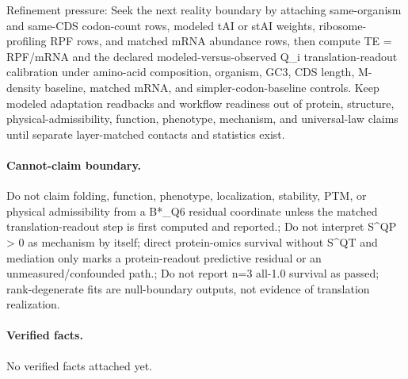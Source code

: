 Refinement pressure: Seek the next reality boundary by attaching same-organism and same-CDS codon-count rows, modeled tAI or stAI weights, ribosome-profiling RPF rows, and matched mRNA abundance rows, then compute TE = RPF/mRNA and the declared modeled-versus-observed Q\_i translation-readout calibration under amino-acid composition, organism, GC3, CDS length, M-density baseline, matched mRNA, and simpler-codon-baseline controls. Keep modeled adaptation readbacks and workflow readiness out of protein, structure, physical-admissibility, function, phenotype, mechanism, and universal-law claims until separate layer-matched contacts and statistics exist.

\paragraph{Cannot-claim boundary.} Do not claim folding, function, phenotype, localization, stability, PTM, or physical admissibility from a B*\_Q6 residual coordinate unless the matched translation-readout step is first computed and reported.; Do not interpret S\textasciicircum{}QP > 0 as mechanism by itself; direct protein-omics survival without S\textasciicircum{}QT and mediation only marks a protein-readout predictive residual or an unmeasured/confounded path.; Do not report n=3 all-1.0 survival as passed; rank-degenerate fits are null-boundary outputs, not evidence of translation realization.

\paragraph{Verified facts.}
No verified facts attached yet.
